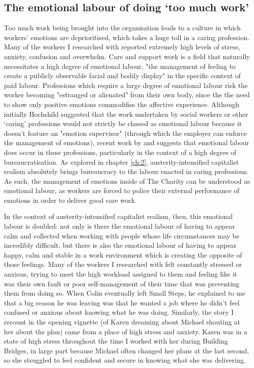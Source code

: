 \subsection{The emotional labour of doing `too much work'}
Too much work being brought into the organisation leads to a culture in which workers' emotions are deprioritised, which takes a huge toll in a caring profession. Many of the workers I researched with reported extremely high levels of stress, anxiety, confusion and overwhelm. Care and support work is a field that naturally necessitates a high degree of emotional labour, "the management of feeling to create a publicly observable facial and bodily display" \citep[p. 7]{hochschild_managed_2012} in the specific context of paid labour. Professions which require a large degree of emotional labour risk the worker becoming "estranged or alienated" from their own body, since the the need to show only positive emotions commodifies the affective experience. Although initially Hochshild suggested that the work undertaken by social workers or other ‘caring’ professions would not strictly be classed as emotional labour because it doesn’t feature an "emotion supervisor" (through which the employer can enforce the management of emotions), recent work by \citet{leeson_emotional_2010} and \citet{winter_emotional_2019} suggests that emotional labour does occur in these professions, particularly in the context of a high degree of bureaucratisation. As explored in chapter \ref{ch:2}, austerity-intensified capitalist realism absolutely brings bureaucracy to the labour enacted in caring professions. As such, the management of emotions inside of The Charity can be understood as emotional labour, as workers are forced to police their external performance of emotions in order to deliver good care work.

In the context of austerity-intensified capitalist realism, then, this emotional labour is doubled: not only is there the emotional labour of having to appear calm and collected when working with people whose life circumstances may be incredibly difficult, but there is also the emotional labour of having to appear happy, calm and stable in a work environment which is creating the opposite of those feelings. Many of the workers I researched with felt constantly stressed or anxious, trying to meet the high workload assigned to them and feeling like it was their own fault or poor self-management of their time that was preventing them from doing so. When Colin eventually left Small Steps, he explained to me that a big reason he was leaving was that he wanted a job where he didn't feel confused or anxious about knowing what he was doing. Similarly, the story I recount in the opening vignette (of Karen dreaming about Michael shouting at her about the plan) came from a place of high stress and anxiety. Karen was in a state of high stress throughout the time I worked with her during Building Bridges, in large part because Michael often changed her plans at the last second, so she struggled to feel confident and secure in knowing what she was delivering.

